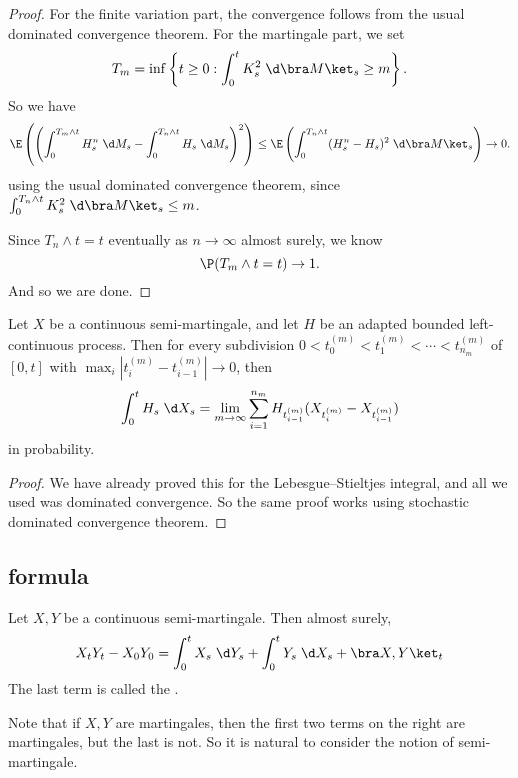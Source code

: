 \documentclass[a4paper]{article}
\begin{document}
\begin{proof}
  For the finite variation part, the convergence follows from the usual dominated convergence theorem. For the martingale part, we set
  \[
    T_m = \inf \left\{t \geq 0: \int_0^t K_s^2 \;\d \bra M\ket_s \geq m\right\}.
  \]
  So we have
  \[
    \E \left(\left(\int_0^{T_m \wedge t} H_s^n \;\d M_s - \int_0^{T_n \wedge t} H_s\;\d M_s\right)^2\right) \leq \E \left(\int_0^{T_n \wedge t} (H_s^n- H_s)^2 \;\d \bra M\ket_s\right) \to 0.
  \]
  using the usual dominated convergence theorem, since $\int_0^{T_n \wedge t} K_s^2 \;\d \bra M\ket_s \leq m$.

  Since $T_n \wedge t = t$ eventually as $n \to \infty$ almost surely, we know
  \[
    \P(T_m \wedge t = t) \to 1.
  \]
  And so we are done.
\end{proof}

\begin{prop}
  Let $X$ be a continuous semi-martingale, and let $H$ be an adapted bounded left-continuous process. Then for every subdivision $0 < t_0^{(m)} < t_1^{(m)} < \cdots < t_{n_m}^{(m)}$ of $[0, t]$ with $\max_i |t_i^{(m)} - t_{i - 1}^{(m)}| \to 0$, then
  \[
    \int_0^t H_s \;\d X_s = \lim_{m \to \infty} \sum_{i = 1}^{n_m} H_{t_{i - 1}^{(m)}} (X_{t_i^{(m)}} - X_{t_{i - 1}^{(m)}})
  \]
  in probability.
\end{prop}

\begin{proof}
  We have already proved this for the Lebesgue--Stieltjes integral, and all we used was dominated convergence. So the same proof works using stochastic dominated convergence theorem.
\end{proof}

\subsection{ formula}
\begin{thm}
  Let $X, Y$ be a continuous semi-martingale. Then almost surely,
  \[
    X_t Y_t - X_0 Y_0 = \int_0^t X_s \;\d Y_s + \int_0^t Y_s\;\d X_s + \bra X, Y\ket_t
  \]
  The last term is called the .
\end{thm}
Note that if $X, Y$ are martingales, then the first two terms on the right are martingales, but the last is not. So it is natural to consider the notion of semi-martingale.
\end{document}
